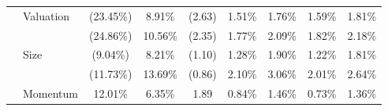 \documentclass[12pt]{article}
\begin{document}
\begin{table}[H]
{\begin{tabular}{@{}llccccccc@{}}
                              & Valuation         & (23.45\%)                                                        & 8.91\%                                                               & (2.63)                                                 & 1.51\%                                                        & 1.76\%                                                       & 1.59\%                                                        & 1.81\%                                                      \\
                              &                   & {\color[HTML]{303498} (24.86\%)}                                 & {\color[HTML]{303498} 10.56\%}                                       & {\color[HTML]{303498} (2.35)}                          & {\color[HTML]{303498} 1.77\%}                                 & {\color[HTML]{303498} 2.09\%}                                & {\color[HTML]{303498} 1.82\%}                                 & {\color[HTML]{303498} 2.18\%}                               \\
                              & Size              & (9.04\%)                                                         & 8.21\%                                                               & (1.10)                                                 & 1.28\%                                                        & 1.90\%                                                       & 1.22\%                                                        & 1.81\%                                                      \\
                              &                   & {\color[HTML]{303498} (11.73\%)}                                 & {\color[HTML]{303498} 13.69\%}                                       & {\color[HTML]{303498} (0.86)}                          & {\color[HTML]{303498} 2.10\%}                                 & {\color[HTML]{303498} 3.06\%}                                & {\color[HTML]{303498} 2.01\%}                                 & {\color[HTML]{303498} 2.64\%}                               \\
                              & Momentum          & 12.01\%                                                          & 6.35\%                                                               & 1.89                                                   & 0.84\%                                                        & 1.46\%                                                       & 0.73\%                                                        & 1.36\%                                                      \\

\end{tabular}}
\end{table}
\end{document}
